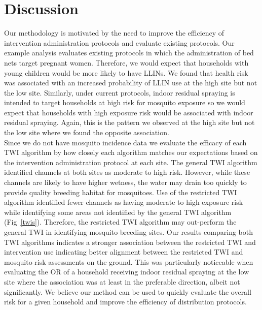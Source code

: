 \documentclass[10pt,letterpaper]{article}\usepackage[]{graphicx}\usepackage[]{color}
\begin{document}
\section*{Discussion}
Our methodology is motivated by the need to improve the efficiency of intervention administration protocols and evaluate existing protocols.  Our example analysis evaluates existing protocols in which the administration of bed nets target pregnant women.  Therefore,  we would expect that households with young children would be more likely to have LLINs.  We found that health risk was associated with an increased probability of LLIN use at the high site but not the low site.  Similarly, under current protocols, indoor residual spraying is intended to target households at high risk for mosquito exposure  so we would expect that households with high exposure risk would be associated with indoor residual spraying.  Again,  this is the pattern we observed at the high site but not the low site where we found the opposite association.\\

Since we do not have mosquito incidence data we evaluate the efficacy of each TWI algorithm by how closely each algorithm matches our expectations based on the intervention administration protocol at each site.  The general TWI algorithm identified channels at both sites as moderate to high risk.  However, while these channels are likely to have higher wetness, the water may drain too quickly to provide quality breeding habitat for mosquitoes.  Use of the restricted TWI algorithm identified fewer channels as having moderate to high exposure risk while identifying some areas not identified by the general TWI algorithm (Fig~\ref{twis}).  Therefore, the restricted TWI algorithm may out-perform the general TWI in identifying mosquito breeding sites.  Our results comparing both TWI algorithms indicates a stronger association between the restricted TWI and intervention use indicating better alignment between the restricted TWI and mosquito risk assessments on the ground. This was particularly noticeable when evaluating the OR of a household receiving indoor residual spraying at the low site where the association was at least in the preferable direction, albeit not significantly.  We believe our method can be used to quickly evaluate the overall risk for a given household and improve the efficiency of distribution protocols.\\
\end{document}
